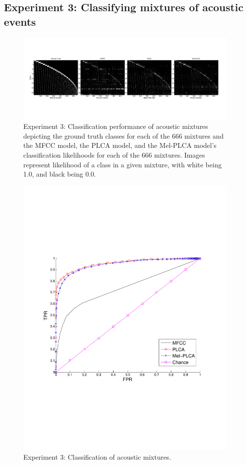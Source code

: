 \documentclass[a4paper,10pt,final]{ThesisStyle}
\begin{document}
\subsection{Experiment 3: Classifying mixtures of acoustic events}


\begin{figure}
\centering
\includegraphics[width=0.99\textwidth]{images/mixture-img-results.pdf}
\caption{Experiment 3: Classification performance of acoustic mixtures depicting the ground truth classes for each of the 666 mixtures and the MFCC model, the PLCA model, and the Mel-PLCA model's classification likelihoods for each of the 666 mixtures. Images represent likelihood of a class in a given mixture, with white being 1.0, and black being 0.0.}
\label{fig:mixture-images}
\end{figure}


\begin{figure}
\centering
\includegraphics[width=0.99\textwidth]{images/mixture-roc-results.pdf}
\caption{Experiment 3: Classification of acoustic mixtures.}
\label{fig:mixture-roc-results}
\end{figure}
\end{document}
